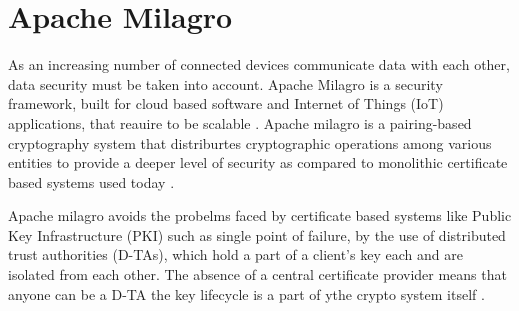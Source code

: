\section{Apache Milagro}
 

As an increasing number of connected devices communicate data with
each other, data security must be taken into account. Apache Milagro
is a security framework, built for cloud based software and Internet
of Things (IoT) applications, that reauire to be scalable
\cite{hid-sp18-503-www-milagro}. Apache milagro is a pairing-based
cryptography system that distriburtes cryptographic operations among
various entities to provide a deeper level of security as compared to
monolithic certificate based systems used today
\cite{hid-sp18-503-www-milagro-docs}.

Apache milagro avoids the probelms faced by certificate based systems
like Public Key Infrastructure (PKI) such as single point of failure,
by the use of distributed trust authorities (D-TAs), which hold a part
of a client's key each and are isolated from each other. The absence
of a central certificate provider means that anyone can be a D-TA the
key lifecycle is a part of ythe crypto system
itself \cite{hid-sp18-503-www-milagro-docs}.
